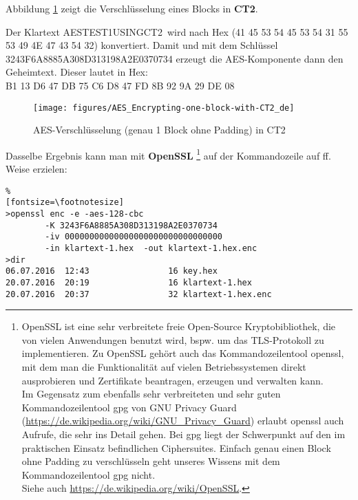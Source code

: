 \noindent Abbildung \ref{AES_Encrypting-one-block-with-CT2} zeigt die Verschlüsselung
eines Blocks in {\bfseries CT2}.

\noindent Der Klartext \glqq AESTEST1USINGCT2\grqq~wird nach Hex
(41 45 53 54 45 53 54 31 55 53 49 4E 47 43 54 32)
konvertiert. Damit und mit dem Schlüssel 3243F6A8885A308D313198A2E0370734
erzeugt die AES-Komponente dann den Geheimtext. Dieser lautet in Hex:\\
B1 13 D6 47 DB 75 C6 D8 47 FD 8B 92 9A 29 DE 08

\begin{figure}[ht]
\begin{center}
\texttt{[image: figures/AES\_Encrypting-one-block-with-CT2\_de]}
\caption{AES-Verschlüsselung (genau 1 Block ohne Padding) in CT2} 
\label{AES_Encrypting-one-block-with-CT2}
\end{center}
\end{figure}

\vspace{15pt}
\noindent Dasselbe Ergebnis kann man mit {\bfseries OpenSSL}%
\footnote{%
      OpenSSL ist eine sehr verbreitete freie Open-Source Kryptobibliothek,
      die von vielen Anwendungen benutzt wird, bspw. um das TLS-Protokoll zu implementieren.
      Zu OpenSSL gehört auch das Kommandozeilentool openssl, mit dem man die Funktionalität
      auf vielen Betriebssystemen direkt ausprobieren und Zertifikate beantragen, erzeugen
      und verwalten kann.\\
      Im Gegensatz zum ebenfalls sehr verbreiteten und sehr guten Kommandozeilentool gpg
      von GNU Privacy Guard
      (\url{https://de.wikipedia.org/wiki/GNU_Privacy_Guard})
      erlaubt openssl auch Aufrufe, die sehr ins Detail gehen.
      Bei gpg liegt der Schwerpunkt auf den im praktischen Einsatz befindlichen Ciphersuites.
      Einfach genau einen Block ohne Padding zu verschlüsseln geht unseres Wissens mit dem
      Kommandozeilentool gpg nicht.\\
      Siehe auch \url{https://de.wikipedia.org/wiki/OpenSSL}.
  }
auf der Kommandozeile auf ff. Weise erzielen:
\begin{opensslcode}
\begin{Verbatim}%
[fontsize=\footnotesize]
>openssl enc -e -aes-128-cbc
        -K 3243F6A8885A308D313198A2E0370734
        -iv 00000000000000000000000000000000
        -in klartext-1.hex  -out klartext-1.hex.enc
>dir
06.07.2016  12:43                16 key.hex
20.07.2016  20:19                16 klartext-1.hex
20.07.2016  20:37                32 klartext-1.hex.enc
\end{Verbatim}
\caption{AES-Verschlüsselung (von genau einem Block ohne Padding) in OpenSSL}
\label{cm_AES_no-padding:OpenSSL_example}
\end{opensslcode}

